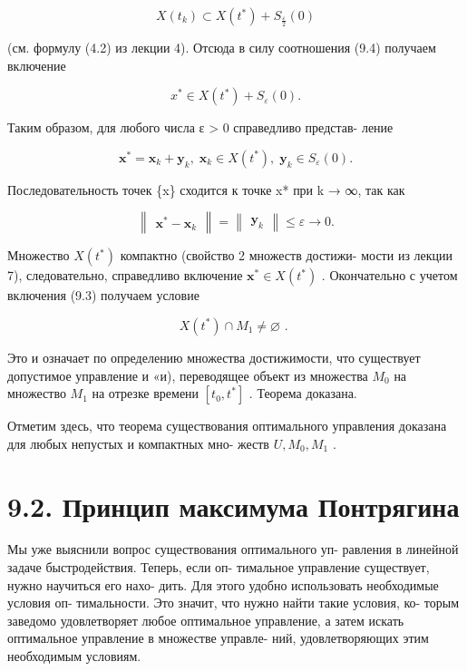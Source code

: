 \documentclass[8pt]{extarticle}
\begin{document}
\[
X\left( {t}_{k}\right)  \subset  X\left( {t}^{ * }\right)  + {S}_{\frac{\varepsilon }{2}}\left( 0\right)
\]

(см. формулу (4.2) из лекции 4). Отсюда в силу соотношения (9.4) получаем включение

\[
{x}^{ * } \in  X\left( {t}^{ * }\right)  + {S}_{\varepsilon }\left( 0\right) .
\]

Таким образом, для любого числа ε > 0 справедливо представ- ление

\[
{\mathbf{x}}^{ * } = {\mathbf{x}}_{k} + {\mathbf{y}}_{k},\;{\mathbf{x}}_{k} \in  X\left( {t}^{ * }\right) ,\;{\mathbf{y}}_{k} \in  {S}_{\varepsilon }\left( 0\right) .
\]

Последовательность точек \{x\} сходится к точке x* при k → ∞, так как

\[
\left\lVert \begin{array}{c} {{\mathbf{x}}^{ * } - {\mathbf{x}}_{k}} \end{array} \right\rVert = \left\lVert \begin{array}{c} {\mathbf{y}}_{k} \end{array} \right\rVert \leq  \varepsilon  \rightarrow  0.
\]

Множество \(X\left( {t}^{ * }\right)\) компактно (свойство 2 множеств достижи- мости из лекции 7), следовательно, справедливо включение \({\mathbf{x}}^{ * } \in  X\left( {t}^{ * }\right)\) . Окончательно с учетом включения (9.3) получаем условие

\[
X\left( {t}^{ * }\right)  \cap  {M}_{1} \neq  \varnothing \text{ . }
\]

Это и означает по определению множества достижимости, что существует допустимое управление и «и), переводящее объект из множества \({M}_{0}\) на множество \({M}_{1}\) на отрезке времени \(\left\lbrack  {{t}_{0},{t}^{ * }}\right\rbrack\) . Теорема доказана.

Отметим здесь, что теорема существования оптимального управления доказана для любых непустых и компактных мно- жеств \(U,{M}_{0},{M}_{1}\) .

\section*{9.2. Принцип максимума Понтрягина}

Мы уже выяснили вопрос существования оптимального уп- равления в линейной задаче быстродействия. Теперь, если оп- тимальное управление существует, нужно научиться его нахо- дить. Для этого удобно использовать необходимые условия оп- тимальности. Это значит, что нужно найти такие условия, ко- торым заведомо удовлетворяет любое оптимальное управление, а затем искать оптимальное управление в множестве управле- ний, удовлетворяющих этим необходимым условиям.
\end{document}
